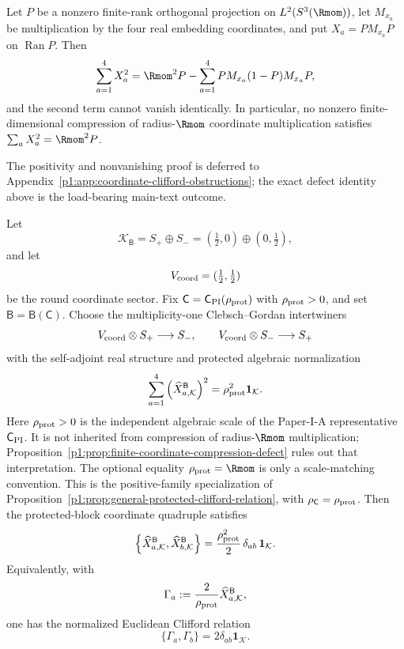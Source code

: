 \documentclass[11pt]{article}
\begin{document}
\begin{proposition}
\label{p1:prop:finite-coordinate-compression-defect}
Let \(P\) be a nonzero finite-rank orthogonal projection on
\(L^2(S^3(\Rmom))\), let \(M_{x_a}\) be multiplication by the four real
embedding coordinates, and put \(X_a=PM_{x_a}P\) on \(\operatorname{Ran}P\).
Then
\[
  \sum_{a=1}^4X_a^2
  =\Rmom^2P-
   \sum_{a=1}^4PM_{x_a}(1-P)M_{x_a}P,
\]
and the second term cannot vanish identically.  In particular, no nonzero
finite-dimensional compression of radius-\(\Rmom\) coordinate multiplication
satisfies \(\sum_aX_a^2=\Rmom^2P\).
\end{proposition}

\noindent
The positivity and nonvanishing proof is deferred to
Appendix~\ref{p1:app:coordinate-clifford-obstructions}; the exact defect
identity above is the load-bearing main-text outcome.

\begin{theorem}
\label{p1:thm:s3one-cliffordization}
Let
\[
    \mathcal K_{\mathsf B}
    =
    S_+\oplus S_-
    =
    (\tfrac12,0)\oplus(0,\tfrac12),
\]
and let
\[
    V_{\rm coord}=(\tfrac12,\tfrac12)
\]
be the round coordinate sector.  Fix
\(\mathsf C=\mathsf C_{\rm PI}(\rho_{\rm prot})\) with
\(\rho_{\rm prot}>0\), and set
\(\mathsf B=\mathsf B(\mathsf C)\).  Choose the multiplicity-one Clebsch--Gordan
intertwiners
\[
    V_{\rm coord}\otimes S_+\longrightarrow S_-,
    \qquad
    V_{\rm coord}\otimes S_-\longrightarrow S_+
\]
with the self-adjoint real structure and protected algebraic normalization
\[
    \sum_{a=1}^{4}
    \left(\widehat X_{a,\mathcal K}^{\mathsf B}\right)^2
    =
    \rho_{\rm prot}^2\mathbf1_{\mathcal K}.
\]
Here \(\rho_{\rm prot}>0\) is the independent algebraic scale of the
Paper-I-A representative \(\mathsf C_{\rm PI}\).  It is not inherited from compression of
radius-\(\Rmom\) multiplication; Proposition~\ref{p1:prop:finite-coordinate-compression-defect}
rules out that interpretation.  The optional equality
\(\rho_{\rm prot}=\Rmom\) is only a scale-matching convention.
This is the positive-family specialization of
Proposition~\ref{p1:prop:general-protected-clifford-relation}, with
\(\rho_{\mathsf C}=\rho_{\rm prot}\).
Then the protected-block coordinate quadruple satisfies
\[
    \left\{
    \widehat X_{a,\mathcal K}^{\mathsf B},
    \widehat X_{b,\mathcal K}^{\mathsf B}
    \right\}
    =
    \frac{\rho_{\rm prot}^2}{2}\,\delta_{ab}\,\mathbf1_{\mathcal K}.
\]
Equivalently, with
\[
    \Gamma_a:=\frac{2}{\rho_{\rm prot}}\widehat X_{a,\mathcal K}^{\mathsf B},
\]
one has the normalized Euclidean Clifford relation
\[
    \{\Gamma_a,\Gamma_b\}=2\delta_{ab}\mathbf1_{\mathcal K}.
\]
\end{theorem}
\end{document}
